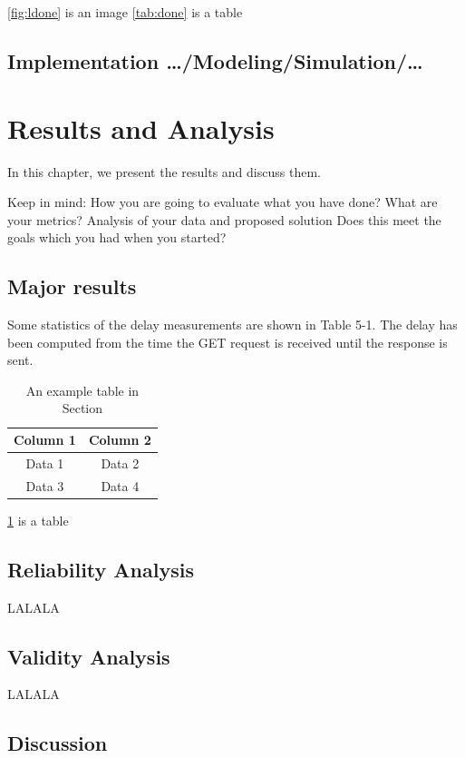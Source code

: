 \documentclass[a4paper,12pt,twocolumn]{article}
\numberwithin{figure}{section}
\numberwithin{table}{section}
\begin{document}
\ref{fig:ldone} is an image 
\ref{tab:done} is a table


\subsection{Implementation …/Modeling/Simulation/…}






\section{Results and Analysis}
In this chapter, we present the results and discuss them.

Keep in mind: How you are going to evaluate what you have done? What are your metrics?
Analysis of your data and proposed solution
Does this meet the goals which you had when you started?

\subsection{Major results}
Some statistics of the delay measurements are shown in Table 5-1.
The delay has been computed from the time the GET request is received until the response is
sent.

\begin{table}[htbp]
    \centering
    \begin{tabular}{|c|c|}
        \hline
        Column 1 & Column 2 \\
        \hline
        Data 1 & Data 2 \\
        Data 3 & Data 4 \\
        \hline
    \end{tabular}
    \caption{An example table in Section}
    \label{tab:res}  
\end{table}

\ref{tab:res} is a table

\subsection{Reliability Analysis}
LALALA

\subsection{Validity Analysis}
LALALA


\subsection{Discussion}
\end{document}
